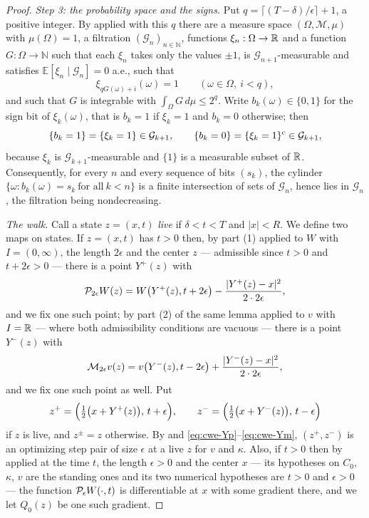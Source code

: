 \begin{proof}
\emph{Step 3: the probability space and the signs.}
Put $q=\lceil(T-\delta)/\epsilon\rceil+1$, a positive integer. By
 applied with this $q$ there are a measure space
$(\Omega,\mathcal M,\mu)$ with $\mu(\Omega)=1$, a filtration
$(\mathcal G_n)_{n\in\mathbb N}$, functions $\xi_n:\Omega\to\mathbb{R}$ and a function
$G:\Omega\to\mathbb N$ such that each $\xi_n$ takes only the values $\pm1$, is
$\mathcal G_{n+1}$-measurable and satisfies
$\mathbb E[\xi_n\mid\mathcal G_n]=0$ a.e., such that
\begin{equation}\label{eq:cwe-block}
  \xi_{qG(\omega)+i}(\omega)=1\qquad(\omega\in\Omega,\ i<q),
\end{equation}
and such that $G$ is integrable with $\int_\Omega G\,d\mu\le2^q$. Write
$b_k(\omega)\in\{0,1\}$ for the sign bit of $\xi_k(\omega)$, that is $b_k=1$ if
$\xi_k=1$ and $b_k=0$ otherwise; then
\begin{equation}\label{eq:cwe-bit}
  \{b_k=1\}=\{\xi_k=1\}\in\mathcal G_{k+1},\qquad
  \{b_k=0\}=\{\xi_k=1\}^{\rm c}\in\mathcal G_{k+1},
\end{equation}
because $\xi_k$ is $\mathcal G_{k+1}$-measurable and $\{1\}$ is a measurable
subset of $\mathbb{R}$. Consequently, for every $n$ and every sequence of bits
$(s_k)$, the cylinder $\{\omega:b_k(\omega)=s_k\ \text{for all}\ k<n\}$ is a
finite intersection of sets of $\mathcal G_n$, hence lies in $\mathcal G_n$,
the filtration being nondecreasing.

\emph{The walk.} Call a state $z=(x,t)$ \emph{live} if
$\delta<t<T$ and $|x|<R$. We define two maps on states. If $z=(x,t)$ has
$t>0$ then, by  part (1) applied to $W$ with
$I=(0,\infty)$, the length $2\epsilon$ and the center $z$ --- admissible since
$t>0$ and $t+2\epsilon>0$ --- there is a point $Y^+(z)$ with
\begin{equation}\label{eq:cwe-Yp}
  \mathcal{P}_{2\epsilon}W(z)=W\bigl(Y^+(z),t+2\epsilon\bigr)
    -\frac{|Y^+(z)-x|^2}{2\cdot2\epsilon},
\end{equation}
and we fix one such point; by part (2) of the same lemma applied to $v$ with
$I=\mathbb{R}$ --- where both admissibility conditions are vacuous --- there is a point
$Y^-(z)$ with
\begin{equation}\label{eq:cwe-Ym}
  \mathcal{M}_{2\epsilon}v(z)=v\bigl(Y^-(z),t-2\epsilon\bigr)
    +\frac{|Y^-(z)-x|^2}{2\cdot2\epsilon},
\end{equation}
and we fix one such point as well. Put
\[
  z^+=\Bigl(\tfrac12\bigl(x+Y^+(z)\bigr),\,t+\epsilon\Bigr),\qquad
  z^-=\Bigl(\tfrac12\bigl(x+Y^-(z)\bigr),\,t-\epsilon\Bigr)
\]
if $z$ is live, and $z^\pm=z$ otherwise. By  and
\eqref{eq:cwe-Yp}--\eqref{eq:cwe-Ym}, $(z^+,z^-)$ is an optimizing step pair of
size $\epsilon$ at a live $z$ for $v$ and $\kappa$. Also, if $t>0$ then by
 applied at the time $t$, the length $\epsilon>0$
and the center $x$ --- its hypotheses on $C_0$, $\kappa$, $v$ are the standing
ones and its two numerical hypotheses are $t>0$ and $\epsilon>0$ --- the
function $\mathcal{P}_\epsilon W(\cdot,t)$ is differentiable at $x$ with some gradient
there, and we let $Q_0(z)$ be one such gradient.


\end{proof}
